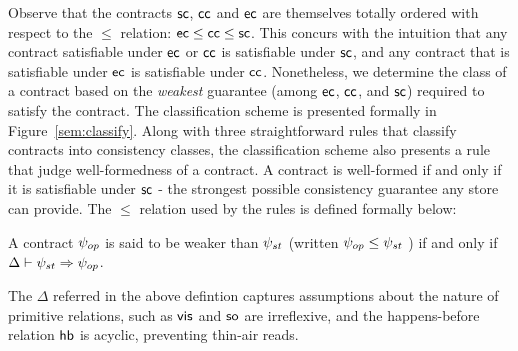 \noindent Observe that the contracts ${\sf sc}$, ${\sf cc}$ and ${\sf ec}$ are
themselves totally ordered with respect to the $\le$ relation: ${\sf ec} \le
{\sf cc} \le {\sf sc}$. This concurs with the intuition that any contract
satisfiable under ${\sf ec}$ or ${\sf cc}$ is satisfiable under ${\sf sc}$, and any
contract that is satisfiable under ${\sf ec}$ is satisfiable under
${\sf cc}$. Nonetheless, we determine the class of a contract based on the
\emph{weakest} guarantee (among ${\sf ec}$, ${\sf cc}$, and ${\sf sc}$) required to
satisfy the contract. The classification scheme is presented formally 
in Figure~\ref{sem:classify}. Along with three straightforward rules
that classify contracts into consistency classes, the classification
scheme also presents a rule that judge well-formedness of a contract.
A contract is well-formed if and only if it is satisfiable under
${\sf sc}$ - the strongest possible consistency guarantee any store can
provide. The $\le$ relation used by the rules is defined formally
below:

\begin{definition}
A contract $\psi_{op}$ is said to be weaker than $\psi_{st}$ (written $\psi_{op}
\le \psi_{st}$ ) if and only if $\Delta \vdash \psi_{st} \Rightarrow \psi_{op}$.
\begin{center}
\end{center}
\end{definition}
\vspace{-1em}
The $\Delta$ referred in the above defintion captures assumptions
about the nature of primitive relations, such as ${\normalfont \textsf{vis}}$ and ${\normalfont \textsf{so}}$
are irreflexive, and the happens-before relation ${\normalfont \textsf{hb}}$ is acyclic,
preventing thin-air reads. 



